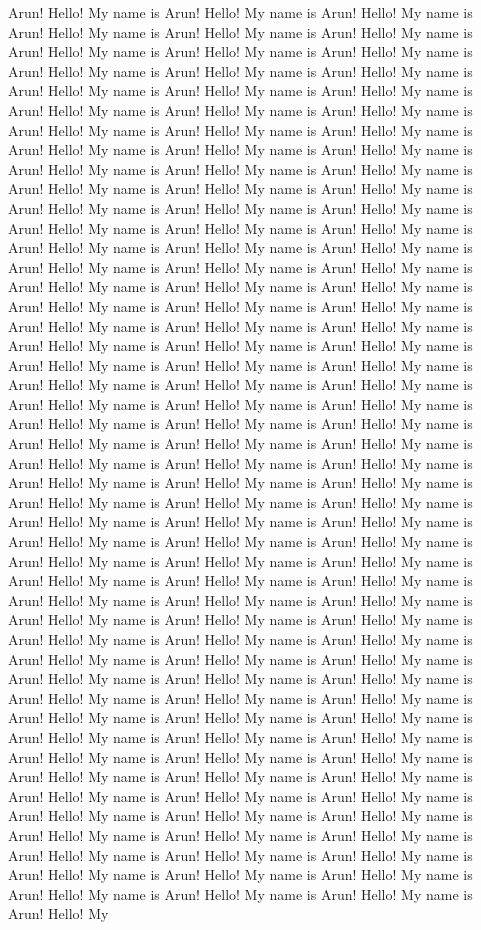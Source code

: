 \documentclass[10pt,a4paper,oneside]{article}
\begin{document}
Arun!	Hello! My name is Arun!	Hello! My name is Arun!	Hello! My name is Arun!	Hello! My name is Arun!	Hello! My name is Arun!	Hello! My name is Arun!	Hello! My name is Arun!	Hello! My name is Arun!	Hello! My name is Arun!	Hello! My name is Arun!	Hello! My name is Arun!	Hello! My name is Arun!	Hello! My name is Arun!	Hello! My name is Arun!	Hello! My name is Arun!	Hello! My name is Arun!	Hello! My name is Arun!	Hello! My name is Arun!	Hello! My name is Arun! 	Hello! My name is Arun!	Hello! My name is Arun!	Hello! My name is Arun!	Hello! My name is Arun!	Hello! My name is Arun!	Hello! My name is Arun!	Hello! My name is Arun!	Hello! My name is Arun!	Hello! My name is Arun!	Hello! My name is Arun!	Hello! My name is Arun!	Hello! My name is Arun!	Hello! My name is Arun!	Hello! My name is Arun!	Hello! My name is Arun!	Hello! My name is Arun!	Hello! My name is Arun!	Hello! My name is Arun!	Hello! My name is Arun!	Hello! My name is Arun! 	Hello! My name is Arun!	Hello! My name is Arun!	Hello! My name is Arun!	Hello! My name is Arun!	Hello! My name is Arun!	Hello! My name is Arun!	Hello! My name is Arun!	Hello! My name is Arun!	Hello! My name is Arun!	Hello! My name is Arun!	Hello! My name is Arun!	Hello! My name is Arun!	Hello! My name is Arun!	Hello! My name is Arun!	Hello! My name is Arun!	Hello! My name is Arun!	Hello! My name is Arun!	Hello! My name is Arun!	Hello! My name is Arun!	Hello! My name is Arun! 	Hello! My name is Arun!	Hello! My name is Arun!	Hello! My name is Arun!	Hello! My name is Arun!	Hello! My name is Arun!	Hello! My name is Arun!	Hello! My name is Arun!	Hello! My name is Arun!	Hello! My name is Arun!	Hello! My name is Arun!	Hello! My name is Arun!	Hello! My name is Arun!	Hello! My name is Arun!	Hello! My name is Arun!	Hello! My name is Arun!	Hello! My name is Arun!	Hello! My name is Arun!	Hello! My name is Arun!	Hello! My name is Arun!	Hello! My name is Arun! 	Hello! My name is Arun!	Hello! My name is Arun!	Hello! My name is Arun!	Hello! My name is Arun!	Hello! My name is Arun!	Hello! My name is Arun!	Hello! My name is Arun!	Hello! My name is Arun!	Hello! My name is Arun!	Hello! My name is Arun!	Hello! My name is Arun!	Hello! My name is Arun!	Hello! My name is Arun!	Hello! My name is Arun!	Hello! My name is Arun!	Hello! My name is Arun!	Hello! My name is Arun!	Hello! My name is Arun!	Hello! My name is Arun!	Hello! My name is Arun! 	Hello! My name is Arun!	Hello! My name is Arun!	Hello! My name is Arun!	Hello! My name is Arun!	Hello! My name is Arun!	Hello! My name is Arun!	Hello! My name is Arun!	Hello! My name is Arun!	Hello! My name is Arun!	Hello! My name is Arun!	Hello! My name is Arun!	Hello! My name is Arun!	Hello! My name is Arun!	Hello! My name is Arun!	Hello! My name is Arun!	Hello! My name is Arun!	Hello! My name is Arun!	Hello! My name is Arun!	Hello! My name is Arun!	Hello! My name is Arun! 	Hello! My name is Arun!	Hello! My name is Arun!	Hello! My name is Arun!	Hello! My name is Arun!	Hello! My name is Arun!	Hello! My name is Arun!	Hello! My name is Arun!	Hello! My name is Arun!	Hello! My name is Arun!	Hello! My name is Arun!	Hello! My name is Arun!	Hello! My name is Arun!	Hello! My name is Arun!	Hello! My name is Arun!	Hello! My name is Arun!	Hello! My name is Arun!	Hello! My name is Arun!	Hello! My name is Arun!	Hello! My name is Arun!	Hello! My 
\end{document}
